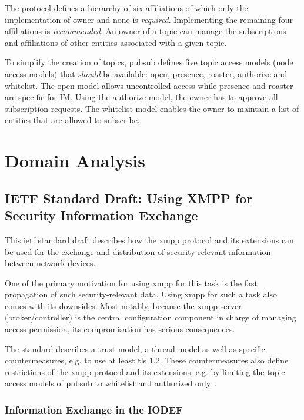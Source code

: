 The protocol defines a hierarchy of six affiliations of which only the implementation of owner and none is \emph{required}.
Implementing the remaining four affiliations is \emph{recommended}.
An owner of a \gls{topic} can manage the subscriptions and affiliations of other entities associated with a given \gls{topic}.

To simplify the creation of \glspl{topic}, \gls{pubsub} defines five \gls{topic} access models (node access models) that \emph{should} be available: open, presence, roaster, authorize and whitelist.
The open model allows uncontrolled access while presence and roaster are specific for IM. Using the authorize model, the owner has to approve all subscription requests.
The whitelist model enables the owner to maintain a list of entities that are allowed to subscribe.


\section{Domain Analysis}

\subsection{IETF Standard Draft: Using XMPP for Security Information Exchange}\label{sec:ietf-standard-draft-using-xmpp-for-security-information-exchange}
This \gls{ietf} standard draft describes how the \gls{xmpp} protocol and its extensions can be used for the exchange and distribution of security-relevant information between network devices.

One of the primary motivation for using \gls{xmpp} for this task is the fast propagation of such security-relevant data.
Using \gls{xmpp} for such a task also comes with its downsides. Most notably, because the \gls{xmpp} server (\gls{broker}/\gls{controller}) is the central configuration component in charge of managing access permission, its compromisation has serious consequences.

The standard describes a trust model, a thread model as well as specific countermeasures, e.g. to use at least \gls{tls} 1.2. These countermeasures also define restrictions of the \gls{xmpp} protocol and its extensions, e.g. by limiting the \gls{topic} access models of \gls{pubsub} to whitelist and authorized only~\cite{ietf-mile-xmpp-grid-05}.

\subsubsection{Information Exchange in the IODEF}

